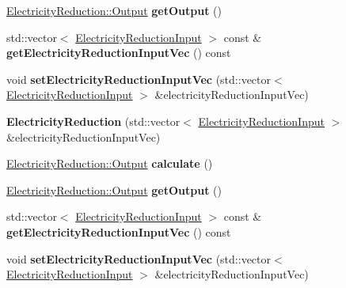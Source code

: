 \begin{DoxyCompactItemize}
\hyperlink{struct_electricity_reduction_1_1_output}{Electricity\+Reduction\+::\+Output} {\bfseries get\+Output} ()
\item 
\mbox{\label{class_electricity_reduction_a710383554d341360eaea5564473583ed}} 
std\+::vector$<$ \hyperlink{class_electricity_reduction_input}{Electricity\+Reduction\+Input} $>$ const  \& {\bfseries get\+Electricity\+Reduction\+Input\+Vec} () const
\item 
\mbox{\label{class_electricity_reduction_ab4c960d8d5b61262cdadce35681bfae6}} 
void {\bfseries set\+Electricity\+Reduction\+Input\+Vec} (std\+::vector$<$ \hyperlink{class_electricity_reduction_input}{Electricity\+Reduction\+Input} $>$ \&electricity\+Reduction\+Input\+Vec)
\item 
\mbox{\label{class_electricity_reduction_a17a8dd763c46277fb2d30bcfc290a396}} 
{\bfseries Electricity\+Reduction} (std\+::vector$<$ \hyperlink{class_electricity_reduction_input}{Electricity\+Reduction\+Input} $>$ \&electricity\+Reduction\+Input\+Vec)
\item 
\mbox{\label{class_electricity_reduction_a3851c4fc6b81d19b05fda3f38cf17b78}} 
\hyperlink{struct_electricity_reduction_1_1_output}{Electricity\+Reduction\+::\+Output} {\bfseries calculate} ()
\item 
\mbox{\label{class_electricity_reduction_aaaef644aa2d1f92304fb5dff0dccc815}} 
\hyperlink{struct_electricity_reduction_1_1_output}{Electricity\+Reduction\+::\+Output} {\bfseries get\+Output} ()
\item 
\mbox{\label{class_electricity_reduction_a710383554d341360eaea5564473583ed}} 
std\+::vector$<$ \hyperlink{class_electricity_reduction_input}{Electricity\+Reduction\+Input} $>$ const  \& {\bfseries get\+Electricity\+Reduction\+Input\+Vec} () const
\item 
\mbox{\label{class_electricity_reduction_ab4c960d8d5b61262cdadce35681bfae6}} 
void {\bfseries set\+Electricity\+Reduction\+Input\+Vec} (std\+::vector$<$ \hyperlink{class_electricity_reduction_input}{Electricity\+Reduction\+Input} $>$ \&electricity\+Reduction\+Input\+Vec)
\end{DoxyCompactItemize}


